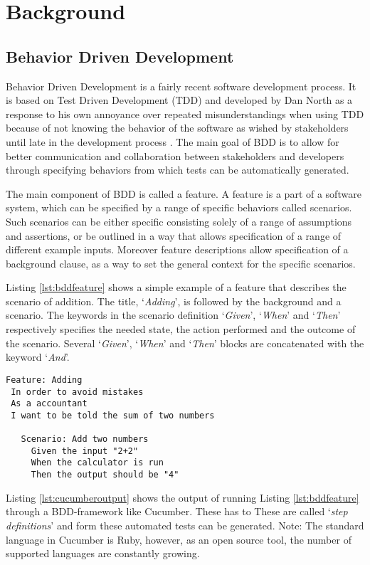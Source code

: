 \section{Background}
\label{sec:Background}

\subsection{Behavior Driven Development}
\label{sub:bdd}
Behavior Driven Development is a fairly recent software development process. 
It is based on Test Driven Development (TDD) and developed by Dan North as a response to his own annoyance over repeated misunderstandings when using TDD because of not knowing the behavior of the software as wished by stakeholders until late in the development process \cite{north2006}. 
The main goal of BDD is to allow for better communication and collaboration between stakeholders and developers through specifying behaviors from which tests can be automatically generated. 

The main component of BDD is called a feature. 
A feature is a part of a software system,
which can be specified by a range of specific behaviors called scenarios.
Such scenarios can be either specific consisting solely of a range of
assumptions and assertions, or be outlined in a way that allows
specification of a range of different example inputs.
Moreover feature descriptions allow specification of a background clause,
as a way to set the general context for the specific scenarios.

Listing \ref{lst:bddfeature} shows a simple example of a feature that describes the scenario of addition. 
The title, `\emph{Adding}', is followed by the background and a scenario. The keywords in the scenario definition `\emph{Given}', `\emph{When}' and `\emph{Then}' respectively specifies the needed state, the action performed and the outcome of the scenario. 
Several `\emph{Given}', `\emph{When}' and `\emph{Then}' blocks are concatenated with the keyword `\emph{And}'.

\begin{lstlisting}[caption={Sample Addition Feature},label={lst:bddfeature}]
Feature: Adding
 In order to avoid mistakes 
 As a accountant
 I want to be told the sum of two numbers

   Scenario: Add two numbers
     Given the input "2+2"
     When the calculator is run 
     Then the output should be "4"
\end{lstlisting}

Listing \ref{lst:cucumberoutput} shows the output of running Listing \ref{lst:bddfeature} through a BDD-framework like Cucumber. These has to 
These are called `\emph{step definitions}' and form these automated tests can be generated. 
Note: The standard language in Cucumber is Ruby, however, as an open source tool, the number of supported languages are constantly growing. 

